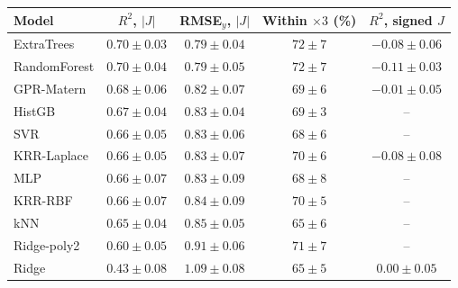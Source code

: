 \begin{tabular}{lcccc}
\toprule
Model & $R^2$, $|J|$ & RMSE$_y$, $|J|$ & Within $\times3$ (\%) & $R^2$, signed $J$\\
\midrule
ExtraTrees & $0.70\pm0.03$ & $0.79\pm0.04$ & $72\pm7$ & $-0.08\pm0.06$\\
RandomForest & $0.70\pm0.04$ & $0.79\pm0.05$ & $72\pm7$ & $-0.11\pm0.03$\\
GPR-Matern & $0.68\pm0.06$ & $0.82\pm0.07$ & $69\pm6$ & $-0.01\pm0.05$\\
HistGB & $0.67\pm0.04$ & $0.83\pm0.04$ & $69\pm3$ & --\\
SVR & $0.66\pm0.05$ & $0.83\pm0.06$ & $68\pm6$ & --\\
KRR-Laplace & $0.66\pm0.05$ & $0.83\pm0.07$ & $70\pm6$ & $-0.08\pm0.08$\\
MLP & $0.66\pm0.07$ & $0.83\pm0.09$ & $68\pm8$ & --\\
KRR-RBF & $0.66\pm0.07$ & $0.84\pm0.09$ & $70\pm5$ & --\\
kNN & $0.65\pm0.04$ & $0.85\pm0.05$ & $65\pm6$ & --\\
Ridge-poly2 & $0.60\pm0.05$ & $0.91\pm0.06$ & $71\pm7$ & --\\
Ridge & $0.43\pm0.08$ & $1.09\pm0.08$ & $65\pm5$ & $0.00\pm0.05$\\
\bottomrule
\end{tabular}
